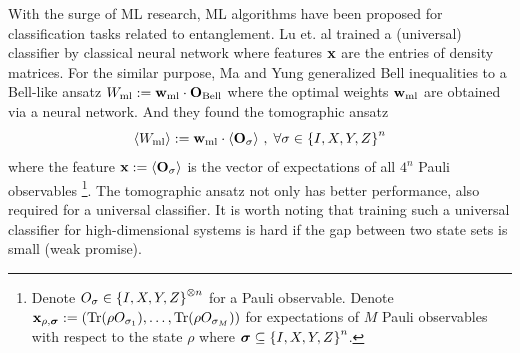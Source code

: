 \documentclass[
aps,
pra,
twocolumn,
floatfix,
]{revtex4-2}
\theoremstyle{plain}
\theoremstyle{definition}
\newcommand{\ew}{W}
\newcommand{\pob}{O}
\newcommand{\dm}{\rho}
\newcommand{\ml}{\text{ml}}
\newcommand{\bellineq}{\textup{Bell}}
\newcommand{\sx}{\hat{\sigma}_x}
\newcommand{\sy}{\hat{\sigma}_y}
\newcommand{\sz}{\hat{\sigma}_z}
\newcommand{\bmsigma}{\bm{\sigma}}
\begin{document}
With the surge of ML research, ML algorithms have been proposed for classification tasks related to entanglement.
Lu et. al \cite{luSeparabilityEntanglementClassifierMachine2018} 
trained a (universal)  classifier by classical neural network
where features $\vb{x}$ are the entries of density matrices.
For the similar purpose, Ma and Yung \cite{maTransformingBellInequalities2018} generalized Bell inequalities to a Bell-like ansatz $\ew_{\ml}:=\vbw_{\ml}\cdot\vb{\pob}_{\bellineq}$ where the optimal weights $\vbw_{\ml}$ are obtained via a neural network.
And they found the tomographic ansatz
\begin{equation}
	\expval{\ew_{\ml}} := 
	\vbw_{\ml} \cdot \expval{\vb{\pob}_{\sigma}} \, , \; \forall \sigma \in  \qty{I,X,Y,Z}^n
	\label{eq:tomographic_ansatz}
\end{equation}
where the feature $\vbx:=\expval{\vb{\pob}_{\sigma}}$ is the vector of expectations of all $4^n$ Pauli observables
\footnote{
	Denote $\pob_{\sigma}\in \qty{I,X,Y,Z}^{\otimes n}$ for a Pauli observable.
	Denote $\vbx_{\dm,\bmsigma}:=(\Tr(\dm\pob_{\sigma_1}),\dots,\Tr(\dm\pob_{\sigma_M}))$ for expectations of $M$ Pauli observables with respect to the state $\dm$ where $\bmsigma\subseteq \qty{I,X,Y,Z}^n$.
}.
The tomographic ansatz not only has better performance, 
also required \cite{luTomographyNecessaryUniversal2016} for a universal  classifier.
It is worth noting that training such a universal classifier for high-dimensional systems is hard if the gap between two state sets is small (weak promise).
\end{document}
